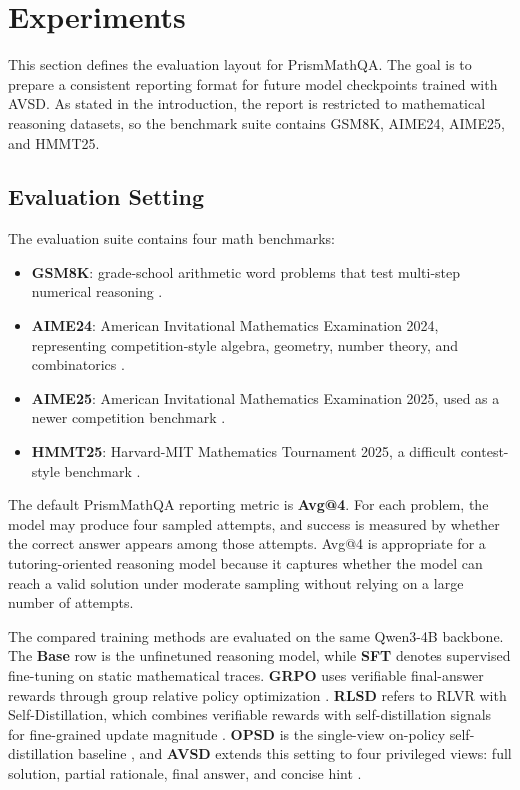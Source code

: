 \section{Experiments}

This section defines the evaluation layout for PrismMathQA. The goal is to prepare a consistent reporting format for future model checkpoints trained with AVSD. As stated in the introduction, the report is restricted to mathematical reasoning datasets, so the benchmark suite contains GSM8K, AIME24, AIME25, and HMMT25.

\subsection{Evaluation Setting}

The evaluation suite contains four math benchmarks:
\begin{itemize}
    \item \textbf{GSM8K}: grade-school arithmetic word problems that test multi-step numerical reasoning \citep{cobbe2021gsm8k}.
    \item \textbf{AIME24}: American Invitational Mathematics Examination 2024, representing competition-style algebra, geometry, number theory, and combinatorics \citep{zhang2024aime}.
    \item \textbf{AIME25}: American Invitational Mathematics Examination 2025, used as a newer competition benchmark \citep{zhang2025aime}.
    \item \textbf{HMMT25}: Harvard-MIT Mathematics Tournament 2025, a difficult contest-style benchmark \citep{balunovic2025matharena}.
\end{itemize}

The default PrismMathQA reporting metric is \textbf{Avg@4}. For each problem, the model may produce four sampled attempts, and success is measured by whether the correct answer appears among those attempts. Avg@4 is appropriate for a tutoring-oriented reasoning model because it captures whether the model can reach a valid solution under moderate sampling without relying on a large number of attempts.

The compared training methods are evaluated on the same Qwen3-4B backbone. The \textbf{Base} row is the unfinetuned reasoning model, while \textbf{SFT} denotes supervised fine-tuning on static mathematical traces. \textbf{GRPO} uses verifiable final-answer rewards through group relative policy optimization \citep{shao2024deepseekmath}. \textbf{RLSD} refers to RLVR with Self-Distillation, which combines verifiable rewards with self-distillation signals for fine-grained update magnitude \citep{yang2026selfdistilledrlvr}. \textbf{OPSD} is the single-view on-policy self-distillation baseline \citep{zhao2026selfdistilled}, and \textbf{AVSD} extends this setting to four privileged views: full solution, partial rationale, final answer, and concise hint \citep{nguyen2026avsd}.

